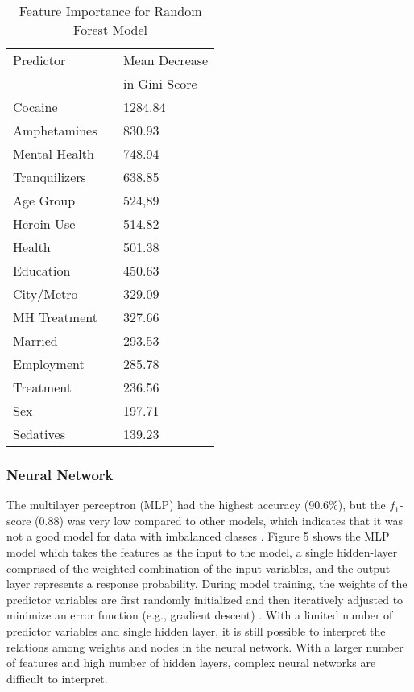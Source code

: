 \documentclass[sigconf]{acmart}
\begin{document}
\begin{table}
  \caption{Feature Importance for Random Forest Model}
  \label{tab:freq}
  \begin{tabular}{lll}
    \toprule
    Predictor&  & Mean Decrease  \\    
             &  & in Gini Score  \\
    \midrule
    Cocaine       &  &  1284.84 \\
    Amphetamines  &  &   830.93 \\
    Mental Health &  &   748.94 \\ 
    Tranquilizers &  &   638.85 \\
    Age Group     &  &   524,89 \\
    Heroin Use    &  &   514.82 \\
    Health        &  &   501.38 \\
    Education     &  &   450.63 \\
    City/Metro    &  &   329.09 \\
    MH Treatment  &  &   327.66 \\
    Married       &  &   293.53 \\
    Employment    &  &   285.78 \\ 
    Treatment     &  &   236.56 \\
    Sex           &  &   197.71 \\
    Sedatives   &  &   139.23 \\
    \bottomrule
  \end{tabular}
\end{table}


\subsubsection{Neural Network}

The multilayer perceptron (MLP) had the highest accuracy (90.6\%), but
the $f_1$-score (0.88) was very low compared to other models, which indicates 
that it was not a good model for data with imbalanced classes \cite{yun09}. 
Figure 5 shows the MLP model which takes the features as the input to the model, 
a single hidden-layer comprised of the weighted combination of the input 
variables, and the output layer represents a response probability. During model 
training, the weights of the predictor variables are first randomly initialized 
and then iteratively adjusted to minimize an error function (e.g., gradient 
descent) \cite{brown12}. With a limited number of predictor variables and single hidden layer, it is still possible to interpret the relations among weights
and nodes in the neural network. With a larger number of features and high
number of hidden layers, complex neural networks are difficult to interpret.
\end{document}
